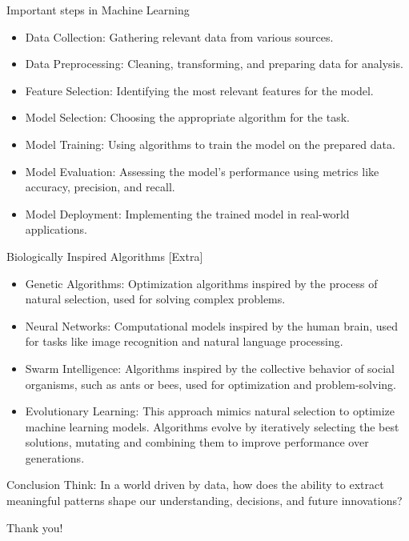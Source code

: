 \documentclass{beamer}
\begin{document}
\begin{frame}{Important steps in Machine Learning}
    \begin{itemize}
        \item Data Collection: Gathering relevant data from various sources.
        \item Data Preprocessing: Cleaning, transforming, and preparing data for analysis.
        \item Feature Selection: Identifying the most relevant features for the model.
        \item Model Selection: Choosing the appropriate algorithm for the task.
        \item Model Training: Using algorithms to train the model on the prepared data.
        \item Model Evaluation: Assessing the model's performance using metrics like accuracy, precision, and recall.
        \item Model Deployment: Implementing the trained model in real-world applications.
    \end{itemize}
\end{frame}
\begin{frame}{Biologically Inspired Algorithms [Extra]}
    \begin{itemize}
        \item Genetic Algorithms: Optimization algorithms inspired by the process of natural selection, used for solving complex problems.
        \item Neural Networks: Computational models inspired by the human brain, used for tasks like image recognition and natural language processing.
        \item Swarm Intelligence: Algorithms inspired by the collective behavior of social organisms, such as ants or bees, used for optimization and problem-solving.
        \item Evolutionary Learning: This approach mimics natural selection to optimize machine learning models. Algorithms evolve by iteratively selecting the best solutions, mutating and combining them to improve performance over generations.
    \end{itemize}
\end{frame}

\begin{frame}{Conclusion}
Think: In a world driven by data, how does the ability to extract meaningful patterns shape our understanding, decisions, and future innovations?

\end{frame}

\begin{frame}[standout]
    Thank you!
\end{frame}
\end{document}
